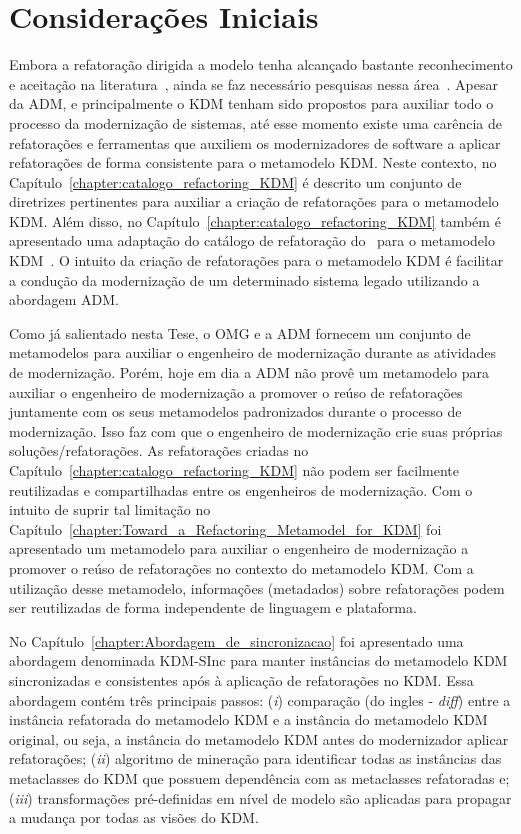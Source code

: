 \section{Considerações Iniciais}

Embora a refatoração dirigida a modelo tenha alcançado bastante reconhecimento e aceitação na literatura~\cite{Moghadam_2012,Maneerat_2011,Fourati_2011,Einarsson_2012,Steimann_2015,Akiyama_2011, Jensen_2010,Arendt_2012,Millan_2009,Tom_2008_2008}, ainda se faz necessário pesquisas nessa área~\cite{durelli_systematic_mapping, revisao_sistematica_uml_refactoring}.
Apesar da ADM, e principalmente o KDM tenham sido propostos para auxiliar todo o processo da modernização de sistemas, até esse momento existe uma carência de refatorações e ferramentas que auxiliem os modernizadores de software a aplicar refatorações de forma consistente para o metamodelo KDM. Neste contexto, no Capítulo~\ref{chapter:catalogo_refactoring_KDM} é descrito um conjunto de diretrizes pertinentes para auxiliar a criação de refatorações para o metamodelo KDM. Além disso, no Capítulo~\ref{chapter:catalogo_refactoring_KDM} também é apresentado uma adaptação do catálogo de refatoração do~ para o metamodelo KDM~\cite{durelli_catalogo}. O intuito da criação de refatorações para o metamodelo KDM é facilitar a condução da modernização de um determinado sistema legado utilizando a abordagem ADM.


Como já salientado nesta Tese, o OMG e a ADM fornecem um conjunto de metamodelos para auxiliar o engenheiro de modernização durante as atividades de modernização. Porém, hoje em dia a ADM não provê um metamodelo para auxiliar o engenheiro de modernização a promover o reúso de refatorações juntamente com os seus metamodelos padronizados durante o processo de modernização. 
Isso faz com que o engenheiro de modernização crie suas próprias soluções/refatorações. As refatorações criadas no Capítulo~\ref{chapter:catalogo_refactoring_KDM} não podem ser facilmente reutilizadas e compartilhadas entre os engenheiros de modernização. Com o intuito de suprir tal limitação no Capítulo~\ref{chapter:Toward_a_Refactoring_Metamodel_for_KDM} foi apresentado um metamodelo para auxiliar o engenheiro de modernização a promover o reúso de refatorações no contexto do metamodelo KDM. Com a utilização desse metamodelo, informações (metadados) sobre refatorações podem ser reutilizadas de forma independente de linguagem e plataforma. 

No Capítulo~\ref{chapter:Abordagem_de_sincronizacao} foi apresentado uma abordagem denominada KDM-SInc para manter instâncias do metamodelo KDM sincronizadas e consistentes após à aplicação de refatorações no KDM. Essa abordagem contém três principais passos: (\textit{i}) comparação (do ingles - \textit{diff}) entre a instância refatorada do metamodelo KDM e a instância do metamodelo KDM original, ou seja, a instância do metamodelo KDM antes do modernizador aplicar refatorações; (\textit{ii}) algoritmo de mineração para identificar todas as instâncias das metaclasses do KDM que possuem dependência com as metaclasses refatoradas e; (\textit{iii}) transformações pré-definidas em nível de modelo são aplicadas para propagar a mudança por todas as visões do KDM.

